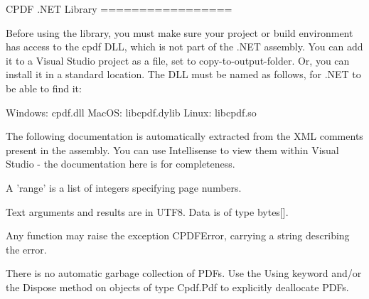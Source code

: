 CPDF .NET Library
=================

Before using the library, you must make sure your project or build environment
has access to the cpdf DLL, which is not part of the .NET assembly. You can add
it to a Visual Studio project as a file, set to copy-to-output-folder. Or, you
can install it in a standard location. The DLL must be named as follows, for
.NET to be able to find it:

Windows: cpdf.dll
MacOS: libcpdf.dylib
Linux: libcpdf.so

The following documentation is automatically extracted from the XML comments
present in the assembly. You can use Intellisense to view them within Visual
Studio - the documentation here is for completeness.

A 'range' is a list of integers specifying page numbers.

Text arguments and results are in UTF8. Data is of type bytes[].

Any function may raise the exception CPDFError, carrying a string describing
the error.

There is no automatic garbage collection of PDFs. Use the Using keyword and/or
the Dispose method on objects of type Cpdf.Pdf to explicitly deallocate PDFs.


